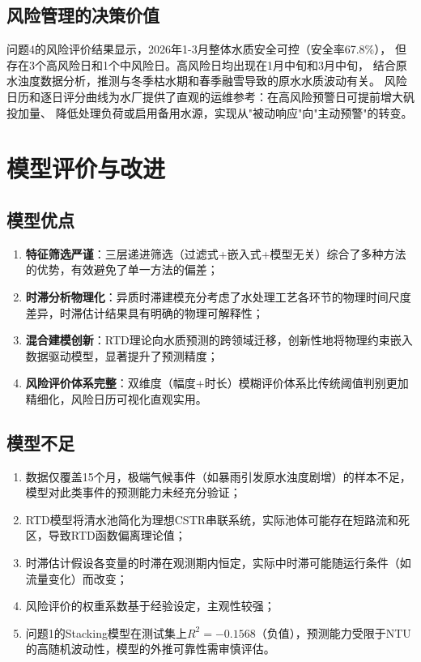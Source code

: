 \documentclass[12pt,a4paper]{ctexart}
\begin{document}
\subsection{风险管理的决策价值}

问题4的风险评价结果显示，2026年1-3月整体水质安全可控（安全率67.8\%），
但存在3个高风险日和1个中风险日。高风险日均出现在1月中旬和3月中旬，
结合原水浊度数据分析，推测与冬季枯水期和春季融雪导致的原水水质波动有关。
风险日历和逐日评分曲线为水厂提供了直观的运维参考：在高风险预警日可提前增大矾投加量、
降低处理负荷或启用备用水源，实现从"被动响应"向"主动预警"的转变。

\section{模型评价与改进}

\subsection{模型优点}

\begin{enumerate}[nosep]
    \item \textbf{特征筛选严谨}：三层递进筛选（过滤式+嵌入式+模型无关）综合了多种方法的优势，有效避免了单一方法的偏差；
    \item \textbf{时滞分析物理化}：异质时滞建模充分考虑了水处理工艺各环节的物理时间尺度差异，时滞估计结果具有明确的物理可解释性；
    \item \textbf{混合建模创新}：RTD理论向水质预测的跨领域迁移，创新性地将物理约束嵌入数据驱动模型，显著提升了预测精度；
    \item \textbf{风险评价体系完整}：双维度（幅度+时长）模糊评价体系比传统阈值判别更加精细化，风险日历可视化直观实用。
\end{enumerate}

\subsection{模型不足}

\begin{enumerate}[nosep]
    \item 数据仅覆盖15个月，极端气候事件（如暴雨引发原水浊度剧增）的样本不足，模型对此类事件的预测能力未经充分验证；
    \item RTD模型将清水池简化为理想CSTR串联系统，实际池体可能存在短路流和死区，导致RTD函数偏离理论值；
    \item 时滞估计假设各变量的时滞在观测期内恒定，实际中时滞可能随运行条件（如流量变化）而改变；
    \item 风险评价的权重系数基于经验设定，主观性较强；
    \item 问题1的Stacking模型在测试集上$R^2=-0.1568$（负值），预测能力受限于NTU的高随机波动性，模型的外推可靠性需审慎评估。
\end{enumerate}
\end{document}
